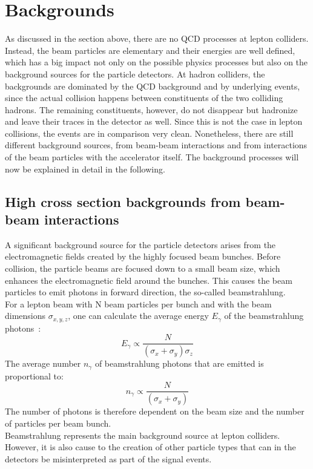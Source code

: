 \section{Backgrounds}
\label{Backgrounds}
As discussed in the section above, there are no QCD processes at lepton colliders.
Instead, the beam particles are elementary and their energies are well defined, which has a big impact not only on the possible physics processes but also on the background sources for the particle detectors.
At hadron colliders, the backgrounds are dominated by the QCD background and by underlying events, since the actual collision happens between constituents of the two colliding hadrons.
The remaining constituents, however, do not disappear but hadronize and leave their traces in the detector as well.
Since this is not the case in lepton collisions, the events are in comparison very clean.
Nonetheless, there are still different background sources, from beam-beam interactions and from interactions of the beam particles with the accelerator itself.
The background processes will now be explained in detail in the following.

\subsection{High cross section backgrounds from beam-beam interactions}
\label{BeamBeam}
A significant background source for the particle detectors arises from the electromagnetic fields created by the highly focused beam bunches.
Before collision, the particle beams are focused down to a small beam size, which enhances the electromagnetic field around the bunches.
This causes the beam particles to emit photons in forward direction, the so-called beamstrahlung.
\\For a lepton beam with N beam particles per bunch and with the beam dimensions $\sigma_{x,y,z}$, one can calculate the average energy $E_{\gamma}$ of the beamstrahlung photons~\cite{Beamstrahlung_CLIC}: 
\begin{equation}
 E_{\gamma} \propto \frac{N}{(\sigma_x+\sigma_y)\sigma_z}
 \label{eq:pair_energy}
\end{equation}
The average number $n_{\gamma}$ of beamstrahlung photons that are emitted is proportional to:
\begin{equation}
 n_{\gamma} \propto \frac{N}{(\sigma_x+\sigma_y)}
 \label{eq:pair_number}
\end{equation}
The number of photons is therefore dependent on the beam size and the number of particles per beam bunch.
\\Beamstrahlung represents the main background source at lepton colliders.
However, it is also cause to the creation of other particle types that can in the detectors be misinterpreted as part of the signal events.

